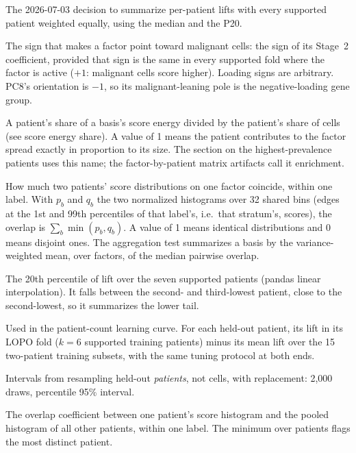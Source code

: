 \begin{description}[leftmargin=0pt,itemsep=3pt,font=\normalfont\bfseries]
\item[Option B.] The 2026-07-03 decision to summarize per-patient lifts with every supported patient weighted equally, using the median and the P20.

\item[Orientation.] The sign that makes a factor point toward malignant cells: the sign of its Stage~2 coefficient, provided that sign is the same in every supported fold where the factor is active ($+1$: malignant cells score higher). Loading signs are arbitrary. PC8's orientation is $-1$, so its malignant-leaning pole is the negative-loading gene group.

\item[Over-representation ratio.] A patient's share of a basis's score energy divided by the patient's share of cells (see score energy share). A value of 1 means the patient contributes to the factor spread exactly in proportion to its size. The section on the highest-prevalence patients uses this name; the factor-by-patient matrix artifacts call it enrichment.

\item[Overlap coefficient.] How much two patients' score distributions on one factor coincide, within one label. With $p_b$ and $q_b$ the two normalized histograms over 32 shared bins (edges at the 1st and 99th percentiles of that label's, i.e.\ that stratum's, scores), the overlap is $\sum_b\min(p_b,q_b)$. A value of 1 means identical distributions and 0 means disjoint ones. The aggregation test summarizes a basis by the variance-weighted mean, over factors, of the median pairwise overlap.

\item[P20 lift.] The 20th percentile of lift over the seven supported patients (pandas linear interpolation). It falls between the second- and third-lowest patient, close to the second-lowest, so it summarizes the lower tail.

\item[Paired gain.] Used in the patient-count learning curve. For each held-out patient, its lift in its LOPO fold ($k = 6$ supported training patients) minus its mean lift over the 15 two-patient training subsets, with the same tuning protocol at both ends.

\item[Patient-cluster bootstrap.] Intervals from resampling held-out \emph{patients}, not cells, with replacement: 2,000 draws, percentile 95\% interval.

\item[Patient-vs-rest overlap.] The overlap coefficient between one patient's score histogram and the pooled histogram of all other patients, within one label. The minimum over patients flags the most distinct patient.


\end{description}

